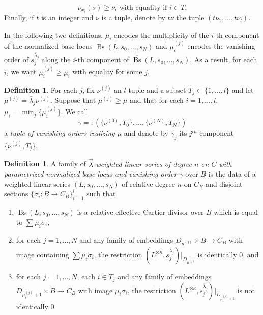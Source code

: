 \documentclass[a4paper,12pt]{amsart}
\theoremstyle{definition}
\newtheorem{defn}[thm]{Definition}
\newcommand{\nuj}{\nu^{(j)}}
\newcommand{\muj}{\mu^{(j)}}
\DeclareMathOperator{\Bs}{Bs}
\newcommand{\blambda}{\bar{\lambda}}
\newcommand{\lambdavec}{{\vec{\lambda}}}
\begin{document}
	$$
	\nu_{x_i}(s) \geq \nu_i \text{ with equality if } i \in T.
	$$
	Finally, if $t$ is an integer and $\nu$ is a tuple, denote by $t\nu$ the tuple $(t\nu_1, \ldots, t\nu_l)$.
	
	In the following two definitions, $\mu_i$ encodes the multiplicity of the $i$-th component of the normalized base locus $\overline{\Bs}(L, s_0, \ldots, s_N)$ and $\mu^{(j)}_i$ encodes the vanishing order of $s_j^{\blambda_j}$ along the $i$-th component of $\overline{\Bs}(L, s_0, \ldots, s_N)$. As a result, for each $i$, we want $\mu^{(j)}_i\geq\mu_i$ with equality for some $j$.
	
	
	
	\begin{defn}\label{defn:gamma}
		For each $j$, fix $\nu^{(j)}$ an $l$-tuple and a subset $T_j \subset \{1, \ldots, l\}$ and let $\muj = \blambda_j \nuj$. Suppose that $\muj \geq \mu$ and that for each $i = 1, \ldots, l$, $\mu_i = \min_{j}\{\mu^{(j)}_i\}$. We call $$\gamma =: (\{\nu^{(0)}, T_0\}, \ldots, \{\nu^{(N)}, T_N\})$$ a \emph{tuple of vanishing orders realizing $\mu$} and denote by $\gamma_j$ its $j^{th}$ component $\{\nu^{(j)}, T_j\}$. 
	\end{defn}
	
	\begin{defn} A family of \emph{$\lambdavec$-weighted linear series of degree $n$ on $C$ with parametrized normalized base locus and vanishing order $\gamma$} over $B$ is the data of a weighted linear series $(L, s_0, \ldots, s_N)$ of relative degree $n$ on $C_B$ and disjoint sections $\{\sigma_i : B \to C_B\}_{i = 1}^l$ such that \begin{enumerate}[(1)]
			\item $\overline{\Bs}(L, s_0, \ldots, s_N)$ is a relative effective Cartier divisor over $B$ which is equal to $\sum \mu_i \sigma_i$, 
			\item for each $j = 1, \ldots, N$ and any family of embeddings $D_{\mu^{(j)}} \times B \to C_B$ with image containing $\sum \mu_i \sigma_i$, the restriction $(L^{\otimes \kappa}, s_j^{\blambda_j})|_{D_{\mu^{(j)}}}$ is identically $0$, and
			\item for each $j = 1, \ldots, N$, each $i \in T_j$ and any family of embeddings $D_{\mu^{(j)}_i + 1} \times B \to C_B$ with image $\mu_i \sigma_i$, the restriction $(L^{\otimes \kappa}, s_j^{\blambda_j})|_{D_{{\mu^{(j)}_i}+1}}$ is not identically $0$. 
		\end{enumerate}
	\end{defn}
	
\end{document}

